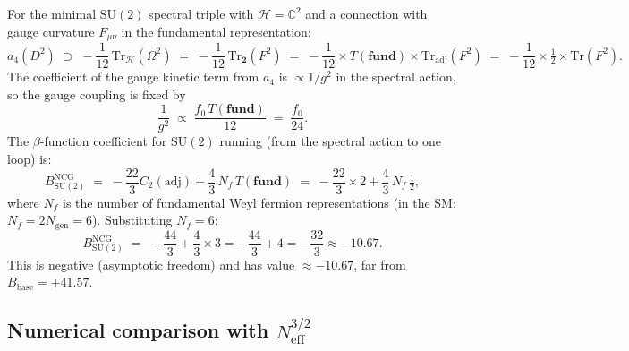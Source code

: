 \documentclass[11pt,a4paper]{article}
\theoremstyle{definition}
\theoremstyle{remark}
\begin{document}
For the minimal $\mathrm{SU}(2)$ spectral triple with $\mathcal{H} = \mathbb{C}^2$
and a connection with gauge curvature $F_{\mu\nu}$ in the fundamental representation:
\begin{equation}
  a_4(D^2) \;\supset\; -\frac{1}{12}\,\mathrm{Tr}_\mathcal{H}(\Omega^2)
  \;=\; -\frac{1}{12}\,\mathrm{Tr}_{\mathbf{2}}(F^2)
  \;=\; -\frac{1}{12} \times T(\mathbf{fund}) \times \mathrm{Tr}_{\mathrm{adj}}(F^2)
  \;=\; -\frac{1}{12} \times \tfrac{1}{2} \times \mathrm{Tr}(F^2).
\end{equation}
The coefficient of the gauge kinetic term from $a_4$ is $\propto 1/g^2$ in
the spectral action, so the gauge coupling is fixed by
\begin{equation}
  \frac{1}{g^2} \;\propto\; \frac{f_0\,T(\mathbf{fund})}{12}
  \;=\; \frac{f_0}{24}.
  \label{eq:gauge_coupling_NCG}
\end{equation}
The $\beta$-function coefficient for $\mathrm{SU}(2)$ running (from the
spectral action to one loop) is:
\begin{equation}
  B_{\mathrm{SU}(2)}^{\mathrm{NCG}}
  \;=\; -\frac{22}{3}C_2(\mathrm{adj}) + \frac{4}{3}\,N_f\,T(\mathbf{fund})
  \;=\; -\frac{22}{3}\times 2 + \frac{4}{3}\,N_f\,\tfrac{1}{2},
  \label{eq:beta_SU2_NCG}
\end{equation}
where $N_f$ is the number of fundamental Weyl fermion representations
(in the SM: $N_f = 2N_{\mathrm{gen}} = 6$).
Substituting $N_f = 6$:
\begin{equation}
  B_{\mathrm{SU}(2)}^{\mathrm{NCG}} \;=\; -\frac{44}{3} + \frac{4}{3} \times 3 = -\frac{44}{3} + 4 = -\frac{32}{3} \approx -10.67.
  \label{eq:beta_SU2_numerical}
\end{equation}
This is negative (asymptotic freedom) and has value $\approx -10.67$,
far from $B_{\mathrm{base}} = +41.57$.

\subsection{Numerical comparison with $N_{\mathrm{eff}}^{3/2}$}
\end{document}
